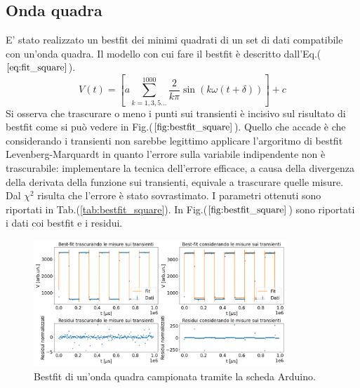 \documentclass{article}
\begin{document}
    \subsection{Onda quadra}
            \label{sez:bestfit_quadra}
            E' stato realizzato un bestfit dei minimi quadrati
            di un set di dati compatibile con un'onda quadra.
            Il modello con cui fare il bestfit è descritto dall'Eq.($\ref{eq:fit_square}$).
                \begin{equation}
                    V(t) = \left[a\sum_{k=1,3,5...}^{1000} \frac{2}{k\pi}\sin\left(k\omega (t+\delta)\right)\right] +c
                    \label{eq:fit_square}
                \end{equation}
            Si osserva che trascurare o meno i punti sui transienti è incisivo
            sul risultato di bestfit come si può vedere in Fig.($\ref{fig:bestfit_square}$).
            Quello che accade è che considerando i transienti non sarebbe legittimo
            applicare l'argoritmo di bestfit Levenberg-Marquardt in quanto l'errore 
            sulla variabile indipendente non è trascurabile: implementare la  tecnica 
            dell'errore efficace, a causa della divergenza della derivata della funzione sui transienti,
            equivale a trascurare quelle misure.
            Dal $\chi^2$ risulta che l'errore è stato sovrastimato. 
            \noindent I parametri ottenuti sono riportati in Tab.(\ref{tab:bestfit_square}).
            In Fig.($\ref{fig:bestfit_square}$) sono riportati i dati coi bestfit e 
            i residui.
            

            \begin{figure}[H]
                \centering
                \includegraphics[width=0.85\textwidth]{bestfit_squarewave.png} %
                \caption{Bestfit di un'onda quadra campionata tramite la scheda Arduino.}
                \label{fig:bestfit_square}
            \end{figure}     
            
\end{document}
